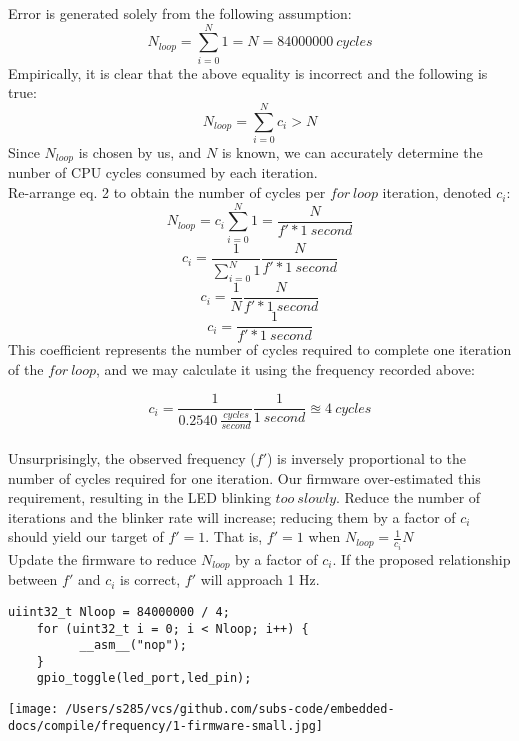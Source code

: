 \documentclass[a4paper,12pt]{article}   	%
\begin{document}
\begin{flushleft}

Error is generated solely from the following assumption:
$$N_{loop} = \sum_{i=0}^{N}1 = N = 84000000\ cycles$$
Empirically, it is clear that the above equality is incorrect and the following is true:
$$N_{loop} = \sum_{i=0}^{N}c_i > N$$
Since $N_{loop}$ is chosen by us, and $N$ is known, we can accurately 
determine the nunber of CPU cycles consumed by each iteration.\\[2 ex]

Re-arrange eq. 2 to obtain the number of cycles per $for\ loop$ iteration, denoted $c_i$:
$$N_{loop} = c_i\sum_{i=0}^{N} 1 = \frac{N}{f' * 1\ second}$$
$$c_i = \frac{1}{\sum_{i=0}^{N} 1} \frac{N}{f' * 1\ second}$$
$$c_i = \frac{1}{N} \frac{N}{f'*1\ second}$$
$$c_i = \frac{1}{f' * 1\ second}$$
This coefficient represents the 
number of cycles required to complete one iteration of the $for\ loop$, and 
we may calculate it using the frequency recorded above:

$$c_i = \frac{1}{0.2540\ \frac{cycles}{second}} \frac{1}{1\ second} \approxeq 4\ cycles$$\\[1 ex]

Unsurprisingly, the observed frequency ($f'$) is inversely proportional to the number of cycles required for one iteration.
Our firmware over-estimated this requirement, resulting in the LED blinking $too\ slowly$. 
Reduce the number of iterations and the blinker rate will increase; reducing them by a factor of $c_i$ should yield our target of $f' = 1$.
That is, $f' = 1$ when $N_{loop} = \frac{1}{c_i}N$\\[2 ex]

Update the firmware to reduce $N_{loop}$ by a factor of $c_i$. If the proposed relationship between $f'$ and $c_i$ is correct, 
$f'$ will approach 1 Hz.\\[2 ex]

\begin{lstlisting}[backgroundcolor = \color{beige}]
    uiint32_t Nloop = 84000000 / 4;
    for (uint32_t i = 0; i < Nloop; i++) {
          __asm__("nop");
    }
    gpio_toggle(led_port,led_pin);
    \end{lstlisting}

\begin{center}
    \texttt{[image: /Users/s285/vcs/github.com/subs-code/embedded-docs/compile/frequency/1-firmware-small.jpg]}
\end{center}


\end{flushleft}
\end{document}
